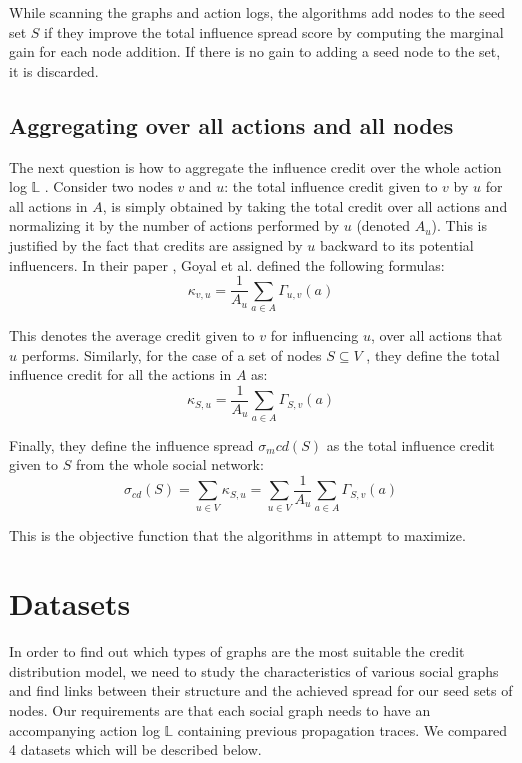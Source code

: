 \documentclass{acm_proc_article-sp}
\begin{document}
While scanning the graphs and action logs, the algorithms add nodes to the seed set $S$ if they improve the total influence spread score by computing the marginal gain for each node addition. If there is no gain to adding a seed node to the set, it is discarded.

\subsection{Aggregating over all actions and all nodes}

The next question is how to aggregate the influence credit over the whole action log $\mathbb{L}$ . Consider two nodes $v$ and $u$: the total influence credit given to $v$ by $u$ for all actions in $A$, is simply obtained by taking the total credit over all actions and normalizing it by the number of actions performed by $u$ (denoted $A_u$). This is justified by the fact that credits are assigned by $u$ backward to its potential influencers. In their paper \cite{goyal:datainfluence}, Goyal et al.  defined the following formulas:
\begin{equation}
	\kappa_{v,u} = \frac{1}{A_u} \displaystyle\sum_{a \in A} \Gamma_{u,v}(a)
\end{equation}

\noindent This denotes the average credit given to $v$ for influencing $u$, over all actions that $u$ performs. Similarly, for the case of a set of nodes $S \subseteq V$ , they define the total influence credit for all the actions in $A$ as:
\begin{equation}
		\kappa_{S,u} = \frac{1}{A_u} \displaystyle\sum_{a \in A} \Gamma_{S,v}(a)
\end{equation}

\noindent Finally, they define the influence spread $\sigma_m{cd}(S)$ as the total influence credit given to $S$ from the whole social network:
\begin{equation}
	\sigma_{cd}(S) = \displaystyle\sum_{u\in V} \kappa_{S,u} = \displaystyle\sum_{u\in V} \frac{1}{A_u} \displaystyle\sum_{a \in A} \Gamma_{S,v}(a)
\end{equation}

This is the objective function that the algorithms in \cite{goyal:datainfluence} attempt to maximize.


\section{Datasets}

In order to find out which types of graphs are the most suitable the credit distribution model, we need to study the characteristics of various social graphs and find links between their structure and the achieved spread for our seed sets of nodes. Our requirements are that each social graph needs to have an accompanying action log $\mathbb{L}$ containing previous propagation traces. We compared 4 datasets which will be described below.
\end{document}
